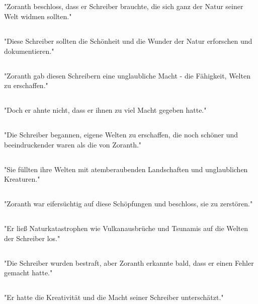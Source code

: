 \documentclass{article}
\begin{document}
\subsection{}
"Zoranth beschloss, dass er Schreiber brauchte, die sich ganz der Natur seiner Welt widmen sollten."
\subsection{}
"Diese Schreiber sollten die Schönheit und die Wunder der Natur erforschen und dokumentieren."
\subsection{}
"Zoranth gab diesen Schreibern eine unglaubliche Macht - die Fähigkeit, Welten zu erschaffen."
\subsection{}
"Doch er ahnte nicht, dass er ihnen zu viel Macht gegeben hatte."
\subsection{}
"Die Schreiber begannen, eigene Welten zu erschaffen, die noch schöner und beeindruckender waren als die von Zoranth."
\subsection{}
"Sie füllten ihre Welten mit atemberaubenden Landschaften und unglaublichen Kreaturen."
\subsection{}
"Zoranth war eifersüchtig auf diese Schöpfungen und beschloss, sie zu zerstören."
\subsection{}
"Er ließ Naturkatastrophen wie Vulkanausbrüche und Tsunamis auf die Welten der Schreiber los."
\subsection{}
"Die Schreiber wurden bestraft, aber Zoranth erkannte bald, dass er einen Fehler gemacht hatte."
\subsection{}
"Er hatte die Kreativität und die Macht seiner Schreiber unterschätzt."
\end{document}
